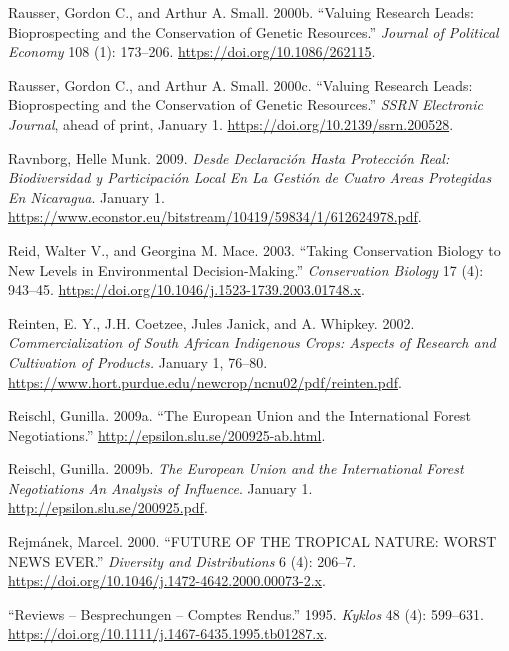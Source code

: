 \begin{CSLReferences}{1}{1}
Rausser, Gordon C., and Arthur A. Small. 2000b. {``Valuing Research
Leads: Bioprospecting and the Conservation of Genetic Resources.''}
\emph{Journal of Political Economy} 108 (1): 173--206.
\url{https://doi.org/10.1086/262115}.

Rausser, Gordon C., and Arthur A. Small. 2000c. {``Valuing Research
Leads: Bioprospecting and the Conservation of Genetic Resources.''}
\emph{SSRN Electronic Journal}, ahead of print, January 1.
\url{https://doi.org/10.2139/ssrn.200528}.

Ravnborg, Helle Munk. 2009. \emph{Desde Declaración Hasta Protección
Real: Biodiversidad y Participación Local En La Gestión de Cuatro Areas
Protegidas En Nicaragua}. January 1.
\url{https://www.econstor.eu/bitstream/10419/59834/1/612624978.pdf}.

Reid, Walter V., and Georgina M. Mace. 2003. {``Taking Conservation
Biology to New Levels in Environmental Decision-Making.''}
\emph{Conservation Biology} 17 (4): 943--45.
\url{https://doi.org/10.1046/j.1523-1739.2003.01748.x}.

Reinten, E. Y., J.H. Coetzee, Jules Janick, and A. Whipkey. 2002.
\emph{Commercialization of South African Indigenous Crops: Aspects of
Research and Cultivation of Products.} January 1, 76--80.
\url{https://www.hort.purdue.edu/newcrop/ncnu02/pdf/reinten.pdf}.

Reischl, Gunilla. 2009a. {``The European Union and the International
Forest Negotiations.''} \url{http://epsilon.slu.se/200925-ab.html}.

Reischl, Gunilla. 2009b. \emph{The European Union and the International
Forest Negotiations An Analysis of Influence}. January 1.
\url{http://epsilon.slu.se/200925.pdf}.

Rejmánek, Marcel. 2000. {``FUTURE OF THE TROPICAL NATURE: WORST NEWS
EVER.''} \emph{Diversity and Distributions} 6 (4): 206--7.
\url{https://doi.org/10.1046/j.1472-4642.2000.00073-2.x}.

{``Reviews -- Besprechungen -- Comptes Rendus.''} 1995. \emph{Kyklos} 48
(4): 599--631. \url{https://doi.org/10.1111/j.1467-6435.1995.tb01287.x}.


\end{CSLReferences}
